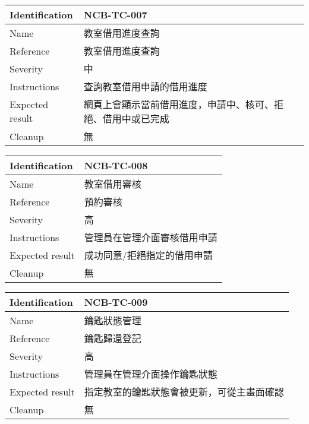 \documentclass{article}
\begin{document}
\bigskip

\begin{tabularx}{\textwidth}{| A{0.3\textwidth} | X |}
	\hline
	Identification  & NCB-TC-007                     \\ \hline
	Name            & 教室借用進度查詢                       \\ \hline
	Reference       & 教室借用進度查詢                       \\ \hline
	Severity        & 中                              \\ \hline
	Instructions    & 查詢教室借用申請的借用進度                  \\ \hline
	Expected result & 網頁上會顯示當前借用進度，申請中、核可、拒絕、借用中或已完成 \\ \hline
	Cleanup         & 無                              \\ \hline
\end{tabularx}

\bigskip

\begin{tabularx}{\textwidth}{| A{0.3\textwidth} | X |}
	\hline
	Identification  & NCB-TC-008     \\ \hline
	Name            & 教室借用審核         \\ \hline
	Reference       & 預約審核           \\ \hline
	Severity        & 高              \\ \hline
	Instructions    & 管理員在管理介面審核借用申請 \\ \hline
	Expected result & 成功同意/拒絕指定的借用申請 \\ \hline
	Cleanup         & 無              \\ \hline
\end{tabularx}

\bigskip

\begin{tabularx}{\textwidth}{| A{0.3\textwidth} | X |}
	\hline
	Identification  & NCB-TC-009            \\ \hline
	Name            & 鑰匙狀態管理                \\ \hline
	Reference       & 鑰匙歸還登記                \\ \hline
	Severity        & 高                     \\ \hline
	Instructions    & 管理員在管理介面操作鑰匙狀態        \\ \hline
	Expected result & 指定教室的鑰匙狀態會被更新，可從主畫面確認 \\ \hline
	Cleanup         & 無                     \\ \hline
\end{tabularx}
\end{document}
